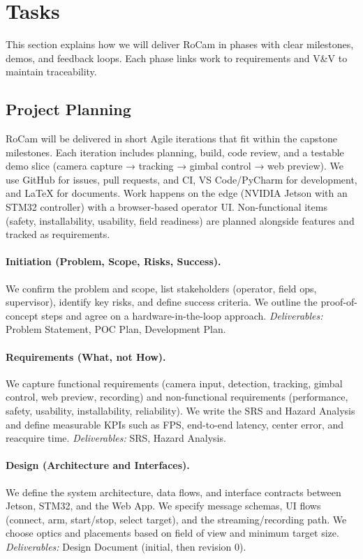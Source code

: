 \documentclass[12pt]{article}
\begin{document}

\section{Tasks}
This section explains how we will deliver RoCam in phases with clear
milestones, demos, and feedback loops. Each phase links work to requirements
and V\&V to maintain traceability.
\subsection{Project Planning}

RoCam will be delivered in short Agile iterations that fit within the capstone
milestones. Each iteration includes planning, build, code review, and a
testable demo slice (camera capture → tracking → gimbal control → web preview).
We use GitHub for issues, pull requests, and CI, VS Code/PyCharm for
development, and LaTeX for documents. Work happens on the edge (NVIDIA Jetson
with an STM32 controller) with a browser-based operator UI. Non-functional
items (safety, installability, usability, field readiness) are planned
alongside features and tracked as requirements.

\paragraph{Initiation (Problem, Scope, Risks, Success).}
We confirm the problem and scope, list stakeholders (operator, field ops,
supervisor), identify key risks, and define success criteria. We outline the
proof-of-concept steps and agree on a hardware-in-the-loop approach.
\emph{Deliverables:} Problem Statement, POC Plan, Development Plan.

\paragraph{Requirements (What, not How).}
We capture functional requirements (camera input, detection, tracking, gimbal
control, web preview, recording) and non-functional requirements (performance,
safety, usability, installability, reliability). We write the SRS and Hazard
Analysis and define measurable KPIs such as FPS, end-to-end latency, center
error, and reacquire time. \emph{Deliverables:} SRS, Hazard Analysis.

\paragraph{Design (Architecture and Interfaces).}
We define the system architecture, data flows, and interface contracts between
Jetson, STM32, and the Web App. We specify message schemas, UI flows (connect,
arm, start/stop, select target), and the streaming/recording path. We choose
optics and placements based on field of view and minimum target size.
\emph{Deliverables:} Design Document (initial, then revision 0).
\end{document}

